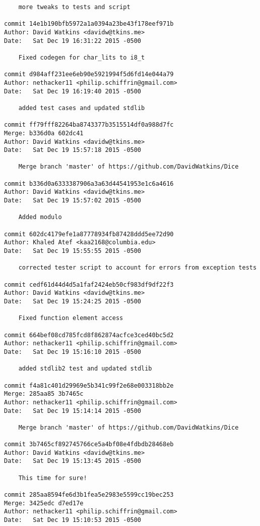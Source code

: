\begin{verbatim}
    more tweaks to tests and script

commit 14e1b190bfb5972a1a0394a23be43f178eef971b
Author: David Watkins <davidw@tkins.me>
Date:   Sat Dec 19 16:31:22 2015 -0500

    Fixed codegen for char_lits to i8_t

commit d984aff231ee6eb90e5921994f5d6fd14e044a79
Author: nethacker11 <philip.schiffrin@gmail.com>
Date:   Sat Dec 19 16:19:40 2015 -0500

    added test cases and updated stdlib

commit ff79fff82264ba8743377b3515514df0a988d7fc
Merge: b336d0a 602dc41
Author: David Watkins <davidw@tkins.me>
Date:   Sat Dec 19 15:57:18 2015 -0500

    Merge branch 'master' of https://github.com/DavidWatkins/Dice

commit b336d0a6333387906a3a63d44541953e1c6a4616
Author: David Watkins <davidw@tkins.me>
Date:   Sat Dec 19 15:57:02 2015 -0500

    Added modulo

commit 602dc4179efe1a87778934fb87428ddd5ee72d90
Author: Khaled Atef <kaa2168@columbia.edu>
Date:   Sat Dec 19 15:55:55 2015 -0500

    corrected tester script to account for errors from exception tests

commit cedf61d44d4d5a1faf2424eb50cf983df9df22f3
Author: David Watkins <davidw@tkins.me>
Date:   Sat Dec 19 15:24:25 2015 -0500

    Fixed function element access

commit 664bef08cd785fcd8f862874acfce3ced40bc5d2
Author: nethacker11 <philip.schiffrin@gmail.com>
Date:   Sat Dec 19 15:16:10 2015 -0500

    added stdlib2 test and updated stdlib

commit f4a81c401d29969e5b341c99f2e68e003318bb2e
Merge: 285aa85 3b7465c
Author: nethacker11 <philip.schiffrin@gmail.com>
Date:   Sat Dec 19 15:14:14 2015 -0500

    Merge branch 'master' of https://github.com/DavidWatkins/Dice

commit 3b7465cf892745766ce5a4bf08e4fdbdb28468eb
Author: David Watkins <davidw@tkins.me>
Date:   Sat Dec 19 15:13:45 2015 -0500

    This time for sure!

commit 285aa8594fe6d3b1fea5e2983e5599cc19bec253
Merge: 3425edc d7ed17e
Author: nethacker11 <philip.schiffrin@gmail.com>
Date:   Sat Dec 19 15:10:53 2015 -0500


\end{verbatim}
